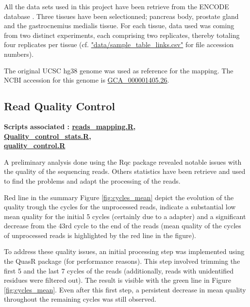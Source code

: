 \documentclass[a4paper, 11pt]{article}
\begin{document}
\begin{multicols}{2}
All the data sets used in this project have been retrieve from the ENCODE database \citep{luo2020new}.
Three tissues have been selectionned; pancreas body, prostate gland and the gastrocnemius medialis tissue.
For each tissue, data used was coming from two distinct experiments, each comprising two replicates, thereby totaling four replicates per tissue (cf. \href{https://github.com/leopoldguyot/BINF-402_Transcriptomic_Project/blob/data/sample_table_links.csv}{"data/sample\_table\_links.csv"} for file accession numbers).

The original UCSC hg38 genome was used as reference for the mapping. The NCBI accession for this genome is \href{https://www.ncbi.nlm.nih.gov/datasets/genome/GCF_000001405.26/}{GCA\_000001405.26}.


\subsection{Read Quality Control}
\begin{scriptsize}
	 \textbf{Scripts associated : \href{https://github.com/leopoldguyot/BINF-402_Transcriptomic_Project/blob/main/reads_mapping.R}{reads\_mapping.R},\\
	 	  \href{https://github.com/leopoldguyot/BINF-402_Transcriptomic_Project/blob/main/Quality_control_stats.R}{Quality\_control\_stats.R}, \\
	 	  \href{https://github.com/leopoldguyot/BINF-402_Transcriptomic_Project/blob/main/quality_control.R}{quality\_control.R}}
\end{scriptsize}


A preliminary analysis done using the Rqc package \citep{Rqc} revealed notable issues with the quality of the sequencing reads. Others statistics have been retrieve and used to find the problems and adapt the processing of the reads. 

Red line in the summary Figure \ref{fig:cycles_mean} depict the evolution of the quality trough the cycles for the unprocessed reads, indicate a substantial low mean quality for the initial 5 cycles (certainly due to a adapter) and a significant decrease from the 43rd cycle to the end of the reads (mean quality of the cycles of unprocessed reads is highlighted by the red line in the figure).

To address these quality issues, an initial processing step was implemented using the QuasR package \citep{QuasR} (for performance reasons). This step involved trimming the first 5 and the last 7 cycles of the reads (additionally, reads with unidentified residues were filtered out). The result is visible with the green line in Figure \ref{fig:cycles_mean}. Even after this first step, a persistent decrease in mean quality throughout the remaining cycles was still observed.


\end{multicols}
\end{document}
